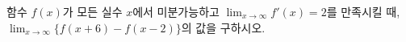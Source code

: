 함수 $f(x)$가 모든 실수 $x$에서 미분가능하고 $\displaystyle\lim_{x\to\infty}f'(x)=2$를 만족시킬 때, $\displaystyle\lim_{x\to\infty}\{f(x+6)-f(x-2)\}$의 값을 구하시오.
